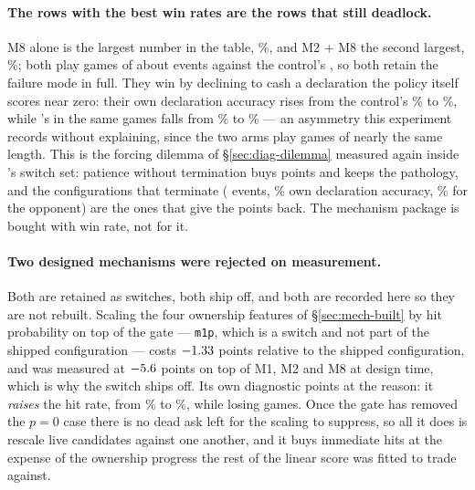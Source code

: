\paragraph{The rows with the best win rates are the rows that still deadlock.}
M8 alone is the largest number in the table, \numAblMeight\%, and M2 + M8 the
second largest, \numAblMtwoMeight\%; both play games of about
\numAblMeightEvents{} events against the control's \numAblControlEvents{}, so both
retain the failure mode in full. They win by declining to cash a declaration the
policy itself scores near zero: their own declaration accuracy rises from the
control's \numAblControlDeclAcc\% to \numAblMeightDeclAcc\%, while \vfour{}'s in
the same games falls from \numAblControlOppDeclAcc\% to
\numAblMeightOppDeclAcc\% --- an asymmetry this experiment records without
explaining, since the two arms play games of nearly the same length. This is the
forcing dilemma of
\S\ref{sec:diag-dilemma} measured again inside \vfive{}'s switch set: patience
without termination buys points and keeps the pathology, and the configurations
that terminate (\numAblFullEvents{} events, \numAblFullDeclAcc\% own declaration
accuracy, \numAblFullOppDeclAcc\% for the opponent) are the ones that give the
points back. The mechanism package is bought with win rate, not for it.

\paragraph{Two designed mechanisms were rejected on measurement.} Both are
retained as switches, both ship off, and both are recorded here so they are not
rebuilt. Scaling the four ownership features of
\S\ref{sec:mech-built} by hit probability on top of the gate --- \texttt{m1p},
which is a switch and not part of the shipped configuration --- costs $-1.33$ points relative to the
shipped configuration, and was measured at $-5.6$ points on top of
M1, M2 and M8 at design time, which is why the switch ships off. Its own
diagnostic points at the reason: it \emph{raises} the hit rate, from
\numAblFullHit\% to \numAblOwnershipPHit\%, while losing games. Once the gate has
removed the $p = 0$ case there is no dead ask left for the scaling to suppress,
so all it does is rescale live candidates against one another, and it buys
immediate hits at the expense of the ownership progress the rest of the linear
score was fitted to trade against.

